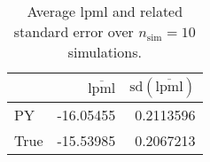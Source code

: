 \begin{table}[H]

\caption{Average lpml and related standard error over $n_{\text{sim}} = 10$ simulations.}
\centering
\begin{tabular}[t]{lrr}
\toprule
  & $\overbar{\text{lpml}}$ & $\text{sd}(\overbar{\text{lpml}})$\\
\midrule
PY & -16.05455 & 0.2113596\\
True & -15.53985 & 0.2067213\\
\bottomrule
\end{tabular}
\end{table}